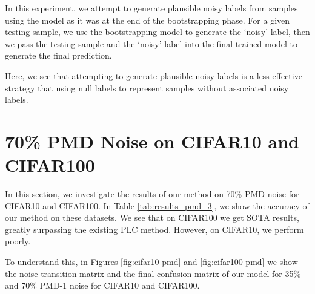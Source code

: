 \documentclass[10pt,twocolumn,letterpaper]{article}
\begin{document}
In this experiment, we attempt to generate plausible noisy labels from samples using the model as it was at the end of the bootstrapping phase. For a given testing sample, we use the bootstrapping model to generate the `noisy' label, then we pass the testing sample and the `noisy' label into the final trained model to generate the final prediction.

\begin{table}[ht!]
    \begin{center}
    \end{center}
    \caption{\small Comparison of Null Labels and Label Generation on Final Accuracy for Asym. 40\% noise on CIFAR10} 
    \label{tab:label_generation_ablation}
\end{table}

Here, we see that attempting to generate plausible noisy labels is a less effective strategy that using null labels to represent samples without associated noisy labels.

\section{70\% PMD Noise on CIFAR10 and CIFAR100}

In this section, we investigate the results of our method on 70\% PMD noise for CIFAR10 and CIFAR100. In Table \ref{tab:results_pmd_3}, we show the accuracy of our method on these datasets. We see that on CIFAR100 we get SOTA results, greatly surpassing the existing PLC method. However, on CIFAR10, we perform poorly.

To understand this, in Figures \ref{fig:cifar10-pmd} and \ref{fig:cifar100-pmd} we show the noise transition matrix and the final confusion matrix of our model for 35\% and 70\% PMD-1 noise for CIFAR10 and CIFAR100.
\end{document}
